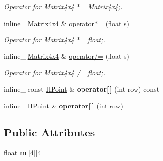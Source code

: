 \begin{DoxyCompactItemize}
\begin{DoxyCompactList}\small\item\em Operator for \hyperlink{class_matrix4x4}{Matrix4x4} $\ast$= \hyperlink{class_matrix4x4}{Matrix4x4};. \end{DoxyCompactList}\item 
\hypertarget{class_matrix4x4_a5b7cd0b32a1ed909719749a3e3835a3d}{inline\+\_\+ \hyperlink{class_matrix4x4}{Matrix4x4} \& \hyperlink{class_matrix4x4_a5b7cd0b32a1ed909719749a3e3835a3d}{operator$\ast$=} (float s)}\label{class_matrix4x4_a5b7cd0b32a1ed909719749a3e3835a3d}

\begin{DoxyCompactList}\small\item\em Operator for \hyperlink{class_matrix4x4}{Matrix4x4} $\ast$= float;. \end{DoxyCompactList}\item 
\hypertarget{class_matrix4x4_a54eb756b6824cd30e56a669d42774b02}{inline\+\_\+ \hyperlink{class_matrix4x4}{Matrix4x4} \& \hyperlink{class_matrix4x4_a54eb756b6824cd30e56a669d42774b02}{operator/=} (float s)}\label{class_matrix4x4_a54eb756b6824cd30e56a669d42774b02}

\begin{DoxyCompactList}\small\item\em Operator for \hyperlink{class_matrix4x4}{Matrix4x4} /= float;. \end{DoxyCompactList}\item 
\hypertarget{class_matrix4x4_a783156e0ef5e5eb7cf9a384feb60d7fb}{inline\+\_\+ const \hyperlink{class_h_point}{H\+Point} \& {\bfseries operator\mbox{[}$\,$\mbox{]}} (int row) const }\label{class_matrix4x4_a783156e0ef5e5eb7cf9a384feb60d7fb}

\item 
\hypertarget{class_matrix4x4_a9a26b36c4fb3d9a5e23acdef378db561}{inline\+\_\+ \hyperlink{class_h_point}{H\+Point} \& {\bfseries operator\mbox{[}$\,$\mbox{]}} (int row)}\label{class_matrix4x4_a9a26b36c4fb3d9a5e23acdef378db561}

\end{DoxyCompactItemize}
\subsection*{Public Attributes}
\begin{DoxyCompactItemize}
\item 
\hypertarget{class_matrix4x4_a5ac0f2e2731307ac872f10cfcec868cd}{float {\bfseries m} \mbox{[}4\mbox{]}\mbox{[}4\mbox{]}}\label{class_matrix4x4_a5ac0f2e2731307ac872f10cfcec868cd}

\end{DoxyCompactItemize}

